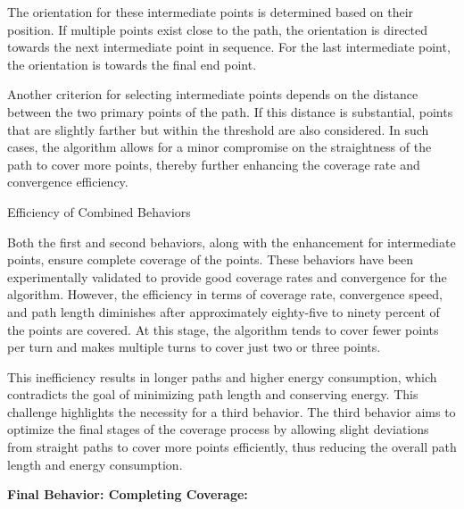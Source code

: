 \vspace*{6mm}   

The orientation for these intermediate points is determined based on their position. If multiple points exist close to the path, the orientation is directed towards the next intermediate point in sequence. For the last intermediate point, the orientation is towards the final end point.

\vspace*{6mm}   

Another criterion for selecting intermediate points depends on the distance between the two primary points of the path. If this distance is substantial, points that are slightly farther but within the threshold are also considered. In such cases, the algorithm allows for a minor compromise on the straightness of the path to cover more points, thereby further enhancing the coverage rate and convergence efficiency.

\vspace*{6mm}   

Efficiency of Combined Behaviors

Both the first and second behaviors, along with the enhancement for intermediate points, ensure complete coverage of the points. These behaviors have been experimentally validated to provide good coverage rates and convergence for the algorithm. However, the efficiency in terms of coverage rate, convergence speed, and path length diminishes after approximately eighty-five to ninety percent of the points are covered. At this stage, the algorithm tends to cover fewer points per turn and makes multiple turns to cover just two or three points.

\vspace*{6mm}   

This inefficiency results in longer paths and higher energy consumption, which contradicts the goal of minimizing path length and conserving energy. This challenge highlights the necessity for a third behavior. The third behavior aims to optimize the final stages of the coverage process by allowing slight deviations from straight paths to cover more points efficiently, thus reducing the overall path length and energy consumption.

\vspace*{6mm}   





\textbf{Final Behavior: Completing Coverage: }


\vspace*{6mm}   

